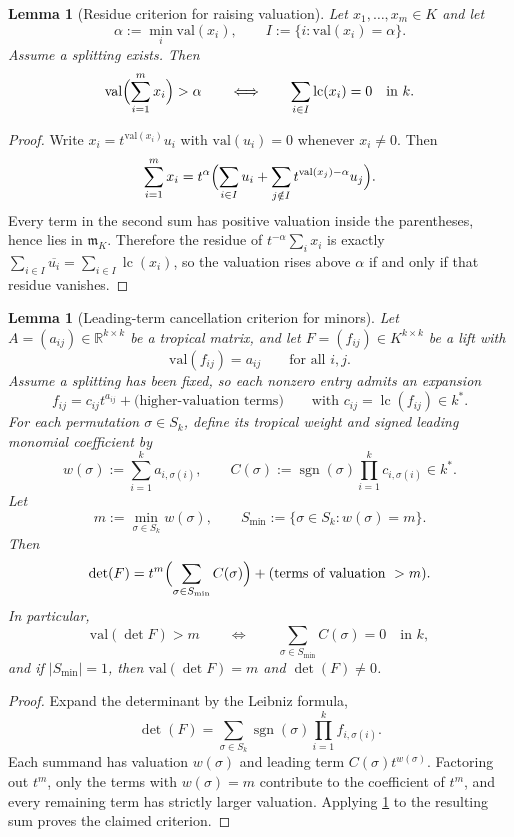 \documentclass[11pt]{amsart}
\numberwithin{equation}{section}
\theoremstyle{plain}
\newtheorem{lemma}[theorem]{Lemma}
\theoremstyle{definition}
\theoremstyle{remark}
\newcommand{\val}{\mathrm{val}}
\newcommand{\RR}{\mathbb{R}}
\begin{document}
\begin{lemma}[Residue criterion for raising valuation]
\label{lem:raise-valuation}
Let $x_1,\dots,x_m\in K$ and let
\[
\alpha:=\min_i \val(x_i), \qquad I:=\{i: \val(x_i)=\alpha\}.
\]
Assume a splitting exists. Then
\[
\val\Bigl(\sum_{i=1}^m x_i\Bigr)>\alpha
\qquad\Longleftrightarrow\qquad
\sum_{i\in I}\operatorname{lc}(x_i)=0
\quad\text{in }k.
\]
\end{lemma}

\begin{proof}
Write $x_i=t^{\val(x_i)}u_i$ with $\val(u_i)=0$ whenever $x_i\neq 0$. Then
\[
\sum_{i=1}^m x_i
=t^{\alpha}\Bigl(\sum_{i\in I} u_i + \sum_{j\notin I} t^{\val(x_j)-\alpha}u_j\Bigr).
\]
Every term in the second sum has positive valuation inside the parentheses, hence lies in $\mathfrak m_K$. Therefore the residue of
$t^{-\alpha}\sum_i x_i$ is exactly $\sum_{i\in I}\overline{u_i}=\sum_{i\in I}\operatorname{lc}(x_i)$, so the valuation rises above $\alpha$
if and only if that residue vanishes.
\end{proof}

\begin{lemma}[Leading-term cancellation criterion for minors]
\label{lem:leading-term-minor-test}
Let $A=(a_{ij})\in \RR^{k\times k}$ be a tropical matrix, and let $F=(f_{ij})\in K^{k\times k}$ be a lift with
\[
\val(f_{ij})=a_{ij}
\qquad\text{for all }i,j.
\]
Assume a splitting has been fixed, so each nonzero entry admits an expansion
\[
f_{ij}=c_{ij}t^{a_{ij}}+\text{(higher-valuation terms)}
\qquad\text{with }c_{ij}=\operatorname{lc}(f_{ij})\in k^*.
\]
For each permutation $\sigma\in S_k$, define its tropical weight and signed leading monomial coefficient by
\[
w(\sigma):=\sum_{i=1}^k a_{i,\sigma(i)},
\qquad
C(\sigma):=\operatorname{sgn}(\sigma)\prod_{i=1}^k c_{i,\sigma(i)}\in k^*.
\]
Let
\[
m:=\min_{\sigma\in S_k}w(\sigma),
\qquad
S_{\min}:=\{\sigma\in S_k:w(\sigma)=m\}.
\]
Then
\[
\det(F)=t^{m}\Bigl(\sum_{\sigma\in S_{\min}} C(\sigma)\Bigr)
+\text{(terms of valuation }>m\text{)}.
\]
In particular,
\[
\val(\det F)>m
\qquad\Longleftrightarrow\qquad
\sum_{\sigma\in S_{\min}} C(\sigma)=0
\quad\text{in }k,
\]
and if $|S_{\min}|=1$, then $\val(\det F)=m$ and $\det(F)\neq 0$.
\end{lemma}

\begin{proof}
Expand the determinant by the Leibniz formula,
\[
\det(F)=\sum_{\sigma\in S_k}\operatorname{sgn}(\sigma)\prod_{i=1}^k f_{i,\sigma(i)}.
\]
Each summand has valuation $w(\sigma)$ and leading term $C(\sigma)t^{w(\sigma)}$. Factoring out $t^m$, only the terms with
$w(\sigma)=m$ contribute to the coefficient of $t^m$, and every remaining term has strictly larger valuation. Applying
\cref{lem:raise-valuation} to the resulting sum proves the claimed criterion.
\end{proof}
\end{document}
